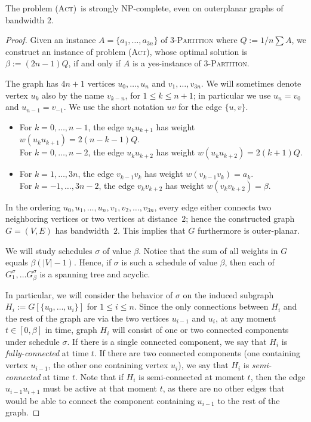 \documentclass[runningheads]{llncs}
\numberwithin{equation}{section}
\newcommand{\set}[1]{\{ #1 \}}
\newcommand{\fromto}[2]{\set{#1, \ldots, #2}}
\newcommand{\act}{\textsc{(Act)}}
\newcommand{\vall}{w}
\begin{document}
\begin{theorem}
\label{thm:hardness_bandwidth}
The problem \act\ is strongly NP-complete, even on outerplanar graphs of bandwidth 2.
\end{theorem}
\begin{proof}
Given an instance $A = \fromto{a_1}{a_{3n}}$ of \textsc{3-Partition} where $Q := 1/n \sum A$, we construct an instance of problem {\act}, whose optimal solution is $\beta := (2n - 1)Q$, if and only if $A$ is a yes-instance of \textsc{3-Partition}.

The graph has $4n+1$ vertices $u_0,\ldots,u_n$ and $v_1,\ldots,v_{3n}$.
We will sometimes denote vertex $u_k$ also by the name $v_{k-n}$, for $1\le k\le n+1$;
in particular we use $u_n=v_0$ and $u_{n-1}=v_{-1}$. We use the short notation $uv$ for the edge $\set{u,v}$.
\begin{itemize}
\item 
For $k=0,\ldots,n-1$,   the edge $u_k u_{k+1}$ has weight $\vall(u_k u_{k+1}) = 2(n-k-1)Q$.\\
For $k=0,\ldots,n-2$,   the edge $u_k u_{k+2}$ has weight $\vall(u_k u_{k+2})=2(k+1)Q$.
\item 
For $k=1,\ldots,3n$,    the edge $v_{k-1} v_k$ has weight $\vall(v_{k-1} v_k)=a_k$.\\
For $k=-1,\ldots,3n-2$, the edge $v_k v_{k+2}$ has weight $\vall(v_k v_{k+2})=\beta$.  
\end{itemize}
In the ordering $u_0,u_1,\ldots,u_n,v_1,v_2,\ldots,v_{3n}$, every edge either connects two neighboring 
vertices or two vertices at distance~$2$; hence the constructed graph $G=(V,E)$ has bandwidth~$2$. 
This implies that $G$ furthermore is outer-planar.

We will study schedules $\sigma$ of value $\beta$. Notice that the sum of all weights in $G$ equals $\beta(|V| - 1)$. Hence, if $\sigma$ is such a schedule of value $\beta$, then each of $G^\sigma_1, \dots G^\sigma_\beta$ is a spanning tree and acyclic.

In particular, we will consider the behavior of $\sigma$ on the induced subgraph $H_i := G[\fromto{u_0}{u_i}]$ for $1\le i\le n$.
Since the only connections between $H_i$ and the rest of the graph are via the two vertices $u_{i-1}$ and $u_i$,
at any moment $t\in[0,\beta]$ in time, graph $H_i$ will consist of one or two connected components
under schedule $\sigma$.
If there is a single connected component, we say that $H_i$ is \emph{fully-connected} at time $t$.
If there are two connected components (one containing vertex $u_{i-1}$, the other one containing 
vertex $u_i$), we say that $H_i$ is \emph{semi-connected} at time $t$.
Note that if $H_i$ is semi-connected at moment $t$, then the edge $u_{i-1} u_{i+1}$ must be active at 
that moment $t$, as there are no other edges that would be able to connect the component containing 
$u_{i-1}$ to the rest of the graph.


\end{proof}
\end{document}
